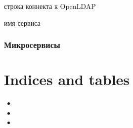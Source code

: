 \documentclass[a4paper,10pt,russian]{sphinxmanual}
\begin{document}
\begin{fulllineitems}
\begin{fulllineitems}
\pysigstartsignatures
{}
\pysigstopsignatures
\sphinxAtStartPar
строка коннекта к OpenLDAP

\end{fulllineitems}



\begin{fulllineitems}

\pysigstartsignatures
{}
\pysigstopsignatures
\sphinxAtStartPar
имя сервиса

\end{fulllineitems}


\end{fulllineitems}



\subsection{Микросервисы}
\label{\detokenize{developer:id3}}

\chapter{Indices and tables}
\label{\detokenize{index:indices-and-tables}}\begin{itemize}
\item {}
\sphinxAtStartPar
{}

\item {}
\sphinxAtStartPar
{}

\item {}
\sphinxAtStartPar
{}

\end{itemize}



\renewcommand{\indexname}{Алфавитный указатель}
\printindex
\end{document}
